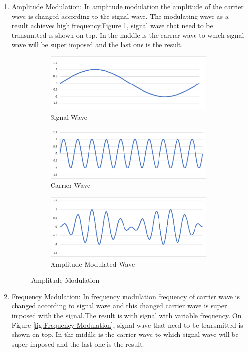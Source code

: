 \documentclass[12pt]{article}
\begin{document}
    \renewcommand{\labelenumi}{\roman{enumi}}
    \begin{enumerate}
        \item Amplitude Modulation: In amplitude modulation the amplitude of the carrier wave is changed according to the signal wave. The modulating wave as a result achieves high frequency.Figure \ref{Fig:Amplitude Modulation}, signal wave that need to be transmitted is shown on top. In the middle is the carrier wave to which signal wave will be super imposed and the last one is the result.
       
 \begin{figure}[H]
\begin{subfigure}[t]{\linewidth}
  \centering
  \includegraphics[width=.5\linewidth]{Images/signalWave.pdf}  
  \caption{Signal Wave}
\end{subfigure}
\begin{subfigure}[t]{\linewidth}
  \centering
  \includegraphics[width=.5\linewidth]{Images/carrierWave.pdf}  
  \caption{Carrier Wave}
  
\end{subfigure}
\begin{subfigure}[t]{\linewidth}
  \centering
  \includegraphics[width=.5\linewidth]{Images/AMwave.pdf}  
\caption{Amplitude Modulated Wave}
 \end{subfigure}
\caption{Amplitude Modulation}
 \label{Fig:Amplitude Modulation}
\end{figure}



         \item Frequency Modulation: In frequency modulation frequency of carrier wave is changed according to signal wave and this changed carrier wave is super imposed with the signal.The result is with signal with variable frequency. On Figure \ref{fig:Frequency Modulation}, signal wave that need to be transmitted is shown on top. In the middle is the carrier wave to which signal wave will be super imposed and the last one is the result.
        

\end{enumerate}
\end{document}
